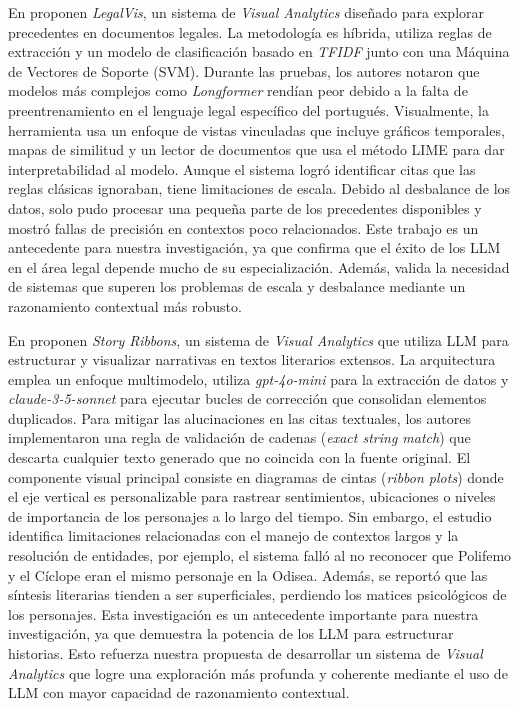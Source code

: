 En \cite{resck_legalvis} proponen \textit{LegalVis}, un sistema de \textit{Visual Analytics} diseñado para explorar precedentes en documentos legales. La metodología es híbrida, utiliza reglas de extracción y un modelo de clasificación basado en \textit{\acs{TFIDF}} junto con una Máquina de Vectores de Soporte (\ac{SVM}). Durante las pruebas, los autores notaron que modelos más complejos como \textit{Longformer} rendían peor debido a la falta de preentrenamiento en el lenguaje legal específico del portugués. Visualmente, la herramienta usa un enfoque de vistas vinculadas que incluye gráficos temporales, mapas de similitud y un lector de documentos que usa el método LIME para dar interpretabilidad al modelo. Aunque el sistema logró identificar citas que las reglas clásicas ignoraban, tiene limitaciones de escala. Debido al desbalance de los datos, solo pudo procesar una pequeña parte de los precedentes disponibles y mostró fallas de precisión en contextos poco relacionados. Este trabajo es un antecedente para nuestra investigación, ya que confirma que el éxito de los \acs{LLM} en el área legal depende mucho de su especialización. Además, valida la necesidad de sistemas que superen los problemas de escala y desbalance mediante un razonamiento contextual más robusto.







En \cite{yeh2025storyribbons} proponen \textit{Story Ribbons}, un sistema de \textit{Visual Analytics} que utiliza \acs{LLM} para estructurar y visualizar narrativas en textos literarios extensos. La arquitectura emplea un enfoque multimodelo, utiliza \textit{gpt-4o-mini} para la extracción de datos y \textit{claude-3-5-sonnet} para ejecutar bucles de corrección que consolidan elementos duplicados. Para mitigar las alucinaciones en las citas textuales, los autores implementaron una regla de validación de cadenas (\textit{exact string match}) que descarta cualquier texto generado que no coincida con la fuente original. El componente visual principal consiste en diagramas de cintas (\textit{ribbon plots}) donde el eje vertical es personalizable para rastrear sentimientos, ubicaciones o niveles de importancia de los personajes a lo largo del tiempo. Sin embargo, el estudio identifica limitaciones relacionadas con el manejo de contextos largos y la resolución de entidades, por ejemplo, el sistema falló al no reconocer que Polifemo y el Cíclope eran el mismo personaje en la Odisea. Además, se reportó que las síntesis literarias tienden a ser superficiales, perdiendo los matices psicológicos de los personajes. Esta investigación es un antecedente importante para nuestra investigación, ya que demuestra la potencia de los \acs{LLM} para estructurar historias. Esto refuerza nuestra propuesta de desarrollar un sistema de \textit{Visual Analytics} que logre una exploración más profunda y coherente mediante el uso de \acs{LLM} con mayor capacidad de razonamiento contextual.













